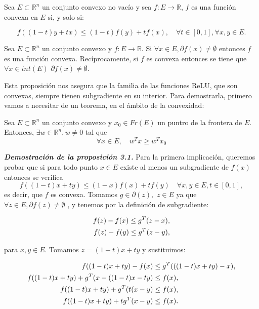 \begin{definicion}
    Sea $E \subset \mathbb{R}^n$ un conjunto convexo no vacío y sea $f:E \rightarrow \mathbb{R}$, $f$ es una función convexa en $E$ si, y solo si:

    $$f( (1-t)y + tx) \leq (1-t) f(y) + tf(x), \quad \forall t \in [0,1], \forall x,y \in E.$$
\end{definicion}

\begin{proposicion}
\label{prop:subgrad}
    Sea $E \subset \mathbb{R}^n$ un conjunto convexo y $f:E \rightarrow \mathbb{R}$. Si $\forall x \in E, \partial f(x) \neq \emptyset$ entonces $f$ es una función convexa. Recíprocamente, si $f$ es convexa  entonces se tiene que $\forall x \in int(E)$ $\partial f(x) \neq \emptyset$.
\end{proposicion}

Esta proposición nos asegura que la familia de las funciones ReLU, que son convexas, siempre tienen subgradiente en su interior. Para demostrarla, primero vamos a necesitar de un teorema, en el ámbito de la convexidad:

\begin{teorema}
    Sea $E \subset \mathbb{R}^n$ un conjunto convexo y $x_0 \in Fr(E)$ un puntro de la frontera de $E$. Entonces, $\exists w \in \mathbb{R}^n, w \neq 0$ tal que
    $$\forall x \in E, \quad w^Tx \geq w^T x_0$$
\end{teorema}

\textbf{\textit{Demostración de la proposición 3.1.}}
Para la primera implicación, queremos probar que si para todo punto $x \in E$ existe al menos un subgradiente de $f(x)$ entonces se verifica
$$f((1-t)x+ty) \leq (1-x)f(x)+tf(y) \quad \forall x,y \in E, t \in [0,1],$$
es decir, que $f$ es convexa. Tomamos $g \in \partial(z),$ $z \in E$ ya que $\forall z \in E,  \partial f(z) \neq \emptyset $ , y tenemos por la definición de subgradiente:

\begin{align}
	f(z) - f(x) \leq g^T(z-x), \notag \\
	f(z) - f(y) \leq g^T(z-y), \label{eq:des2}
\end{align}

para $x,y \in E$. Tomamos $z=(1-t)x + ty$ y sustituimos:

\begin{align}	
	f((1-t)x + ty) - f(x) &\leq g^T(((1-t)x + ty)-x), \notag \\
	f((1-t)x + ty) + g^T(x - ((1-t)x-ty) &\leq f(x), \notag \\
	f((1-t)x + ty) + g^T(t(x-y) &\leq f(x), \notag \\
	f((1-t)x + ty) + tg^T(x-y) &\leq f(x). \label{proof1:f(x)}
\end{align}


